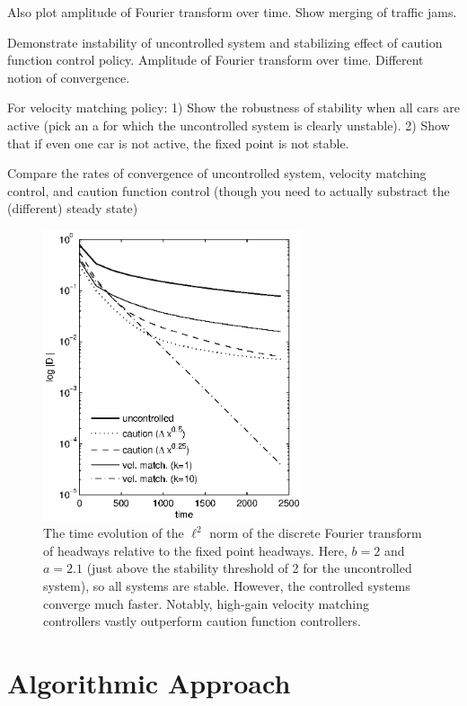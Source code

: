 \documentclass[10pt,twocolumn]{article}
\newcommand{\lm}{\fontfamily{\sfdefault}\selectfont}
\begin{document}
Also plot amplitude of Fourier transform over time. Show merging of traffic jams.

Demonstrate instability of uncontrolled system and stabilizing effect of caution function control policy. Amplitude of Fourier transform over time. Different notion of convergence.

For velocity matching policy: 1) Show the robustness of stability when all cars are active (pick an a for which the uncontrolled system is clearly unstable). 2) Show that if even one car is not active, the fixed point is not stable.

Compare the rates of convergence of uncontrolled system, velocity matching control, and caution function control (though you need to actually substract the (different) steady state)

\begin{figure}[!h]
\lm
\begin{center}
\includegraphics[width=3in]{convscl}
\end{center}
\caption{ \label{fig:convscl} The time evolution of the $\ell^2$ norm of the discrete Fourier transform of headways relative to the fixed point headways. Here, $b=2$ and $a=2.1$ (just above the stability threshold of 2 for the uncontrolled system), so all systems are stable. However, the controlled systems converge much faster. Notably, high-gain velocity matching controllers vastly outperform caution function controllers.}
\end{figure}


\section{Algorithmic Approach}
\end{document}
